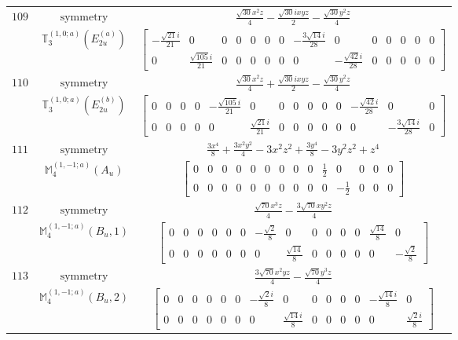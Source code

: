 \documentclass[fleqn,8pt,landscape]{jsarticle}
\begin{document}
\begin{longtable}{ccc}
$ 109 $ & $ \text{symmetry} $ & $ \frac{\sqrt{30} x^{2} z}{4} - \frac{\sqrt{30} i x y z}{2} - \frac{\sqrt{30} y^{2} z}{4} $ \\
$  $ & $ \mathbb{T}_{3}^{(1,0;a)}(E_{2u}^{(a)}) $ & $ \begin{bmatrix} - \frac{\sqrt{21} i}{21} & 0 & 0 & 0 & 0 & 0 & 0 & - \frac{3 \sqrt{14} i}{28} & 0 & 0 & 0 & 0 & 0 & 0 \\ 0 & \frac{\sqrt{105} i}{21} & 0 & 0 & 0 & 0 & 0 & 0 & - \frac{\sqrt{42} i}{28} & 0 & 0 & 0 & 0 & 0 \end{bmatrix} $ \\ \hline
$ 110 $ & $ \text{symmetry} $ & $ \frac{\sqrt{30} x^{2} z}{4} + \frac{\sqrt{30} i x y z}{2} - \frac{\sqrt{30} y^{2} z}{4} $ \\
$  $ & $ \mathbb{T}_{3}^{(1,0;a)}(E_{2u}^{(b)}) $ & $ \begin{bmatrix} 0 & 0 & 0 & 0 & - \frac{\sqrt{105} i}{21} & 0 & 0 & 0 & 0 & 0 & 0 & - \frac{\sqrt{42} i}{28} & 0 & 0 \\ 0 & 0 & 0 & 0 & 0 & \frac{\sqrt{21} i}{21} & 0 & 0 & 0 & 0 & 0 & 0 & - \frac{3 \sqrt{14} i}{28} & 0 \end{bmatrix} $ \\ \hline
$ 111 $ & $ \text{symmetry} $ & $ \frac{3 x^{4}}{8} + \frac{3 x^{2} y^{2}}{4} - 3 x^{2} z^{2} + \frac{3 y^{4}}{8} - 3 y^{2} z^{2} + z^{4} $ \\
$  $ & $ \mathbb{M}_{4}^{(1,-1;a)}(A_{u}) $ & $ \begin{bmatrix} 0 & 0 & 0 & 0 & 0 & 0 & 0 & 0 & 0 & \frac{1}{2} & 0 & 0 & 0 & 0 \\ 0 & 0 & 0 & 0 & 0 & 0 & 0 & 0 & 0 & 0 & - \frac{1}{2} & 0 & 0 & 0 \end{bmatrix} $ \\ \hline
$ 112 $ & $ \text{symmetry} $ & $ \frac{\sqrt{70} x^{3} z}{4} - \frac{3 \sqrt{70} x y^{2} z}{4} $ \\
$  $ & $ \mathbb{M}_{4}^{(1,-1;a)}(B_{u},1) $ & $ \begin{bmatrix} 0 & 0 & 0 & 0 & 0 & 0 & - \frac{\sqrt{2}}{8} & 0 & 0 & 0 & 0 & 0 & \frac{\sqrt{14}}{8} & 0 \\ 0 & 0 & 0 & 0 & 0 & 0 & 0 & \frac{\sqrt{14}}{8} & 0 & 0 & 0 & 0 & 0 & - \frac{\sqrt{2}}{8} \end{bmatrix} $ \\ \hline
$ 113 $ & $ \text{symmetry} $ & $ \frac{3 \sqrt{70} x^{2} y z}{4} - \frac{\sqrt{70} y^{3} z}{4} $ \\
$  $ & $ \mathbb{M}_{4}^{(1,-1;a)}(B_{u},2) $ & $ \begin{bmatrix} 0 & 0 & 0 & 0 & 0 & 0 & - \frac{\sqrt{2} i}{8} & 0 & 0 & 0 & 0 & 0 & - \frac{\sqrt{14} i}{8} & 0 \\ 0 & 0 & 0 & 0 & 0 & 0 & 0 & \frac{\sqrt{14} i}{8} & 0 & 0 & 0 & 0 & 0 & \frac{\sqrt{2} i}{8} \end{bmatrix} $ \\ \hline

\end{longtable}
\end{document}
